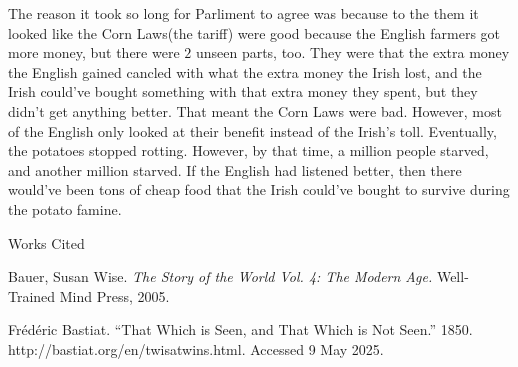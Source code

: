 \documentclass[12pt]{article}
\newcommand{\bibent}{\noindent \hangindent 40pt}
\newenvironment{workscited}{\newpage \begin{center} Works Cited \end{center}}{\newpage }
\begin{document}
\begin{flushleft}
The reason it took so long for Parliment to agree was because to the
them it looked like the Corn Laws(the tariff) were good because the
English farmers got more money, but there were $2$ unseen parts,
too. They were that the extra money the English gained cancled with
what the extra money the Irish lost, and the Irish could've bought
something with that extra money they spent, but they didn't get
anything better.  That meant the Corn Laws were bad. However, most of
the English only looked at their benefit instead of the Irish's toll.
Eventually, the potatoes stopped rotting. However, by that time, a
million people starved, and another million starved. If the English
had listened better, then there would've been tons of cheap food that the Irish could've bought to survive during the potato famine.
\begin{workscited}

\bibent
Bauer, Susan Wise. \textit{The Story of the World Vol. 4: The Modern Age.} Well-Trained Mind Press, 2005.

\bibent
Frédéric Bastiat. ``That Which is Seen, and That Which is Not Seen.'' 1850. http://bastiat.org/en/twisatwins.html. Accessed 9 May 2025.



\end{workscited}

\end{flushleft}
\end{document}
